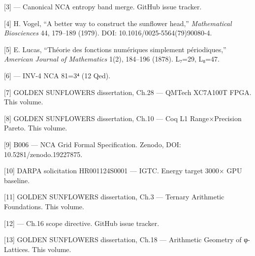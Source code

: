[3]  --- Canonical
NCA entropy band merge. GitHub issue tracker.

[4] H. Vogel, ``A better way to construct the
sunflower head,'' \emph{Mathematical Biosciences}
44, 179--189 (1979). DOI:
10.1016/0025-5564(79)90080-4.

[5] E. Lucas, ``Théorie des fonctions
numériques simplement périodiques,''
\emph{American Journal of Mathematics} 1(2),
184--196 (1878). L₇=29, L₈=47.

[6]
--- INV-4 NCA 81=3⁴ (12 Qed).

[7] GOLDEN SUNFLOWERS dissertation, Ch.28 ---
QMTech XC7A100T FPGA. This volume.

[8] GOLDEN SUNFLOWERS dissertation, Ch.10 ---
Coq L1 Range$\times$Precision Pareto. This volume.

[9] B006 --- NCA Grid Formal Specification.
Zenodo, DOI: 10.5281/zenodo.19227875.

[10] DARPA solicitation HR001124S0001 ---
IGTC. Energy target 3000$\times$ GPU baseline.

[11] GOLDEN SUNFLOWERS dissertation, Ch.3 ---
Ternary Arithmetic Foundations. This volume.

[12]  --- Ch.16
scope directive. GitHub issue tracker.

[13] GOLDEN SUNFLOWERS dissertation, Ch.18 ---
Arithmetic Geometry of φ-Lattices. This volume.

